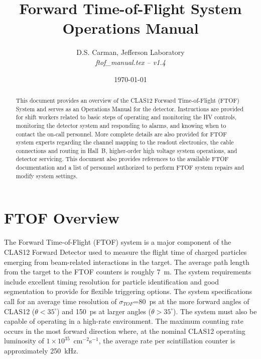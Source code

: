 \documentclass[12pt]{article}
\begin{document}
\title{Forward Time-of-Flight System Operations Manual}

\vskip 0.5cm

\author{D.S. Carman, Jefferson Laboratory\\[0.2ex]
{\it ftof\_manual.tex -- v1.4}}

\date \today
%
\maketitle

\begin{abstract}
This document provides an overview of the CLAS12 Forward Time-of-Flight (FTOF) System and serves 
as an Operations Manual for the detector. Instructions are provided for shift workers related to 
basic steps of operating and monitoring the HV controls, monitoring the detector system and 
responding to alarms, and knowing when to contact the on-call personnel. More complete details 
are also provided for FTOF system experts regarding the channel mapping to the readout electronics, 
the cable connections and routing in Hall~B, higher-order high voltage system operations, and 
detector servicing. This document also provides references to the available FTOF documentation and 
a list of personnel authorized to perform FTOF system repairs and modify system settings.
\end{abstract}

\thispagestyle{empty}

\clearpage

\vfil
\eject

\tableofcontents

\vfil
\eject

\section{FTOF Overview}
\label{intro}

The Forward Time-of-Flight (FTOF) system is a major component of the CLAS12 Forward Detector used 
to measure the flight time of charged particles emerging from beam-related interactions in the 
target. The average path length from the target to the FTOF counters is roughly 7~m. The system
requirements include excellent timing resolution for particle identification and good segmentation 
to provide for flexible triggering options. The system specifications call for an average time 
resolution of $\sigma_{TOF}$=80~ps at the more forward angles of CLAS12 ($\theta < 35^\circ$) and 
150~ps at larger angles ($\theta > 35^\circ$). The system must also be capable of operating in a 
high-rate environment. The maximum counting rate occurs in the most forward direction where, at the 
nominal CLAS12 operating luminosity of $1 \times 10^{35}$~cm$^{-2}$s$^{-1}$, the average rate per 
scintillation counter is approximately 250~kHz.
\end{document}

